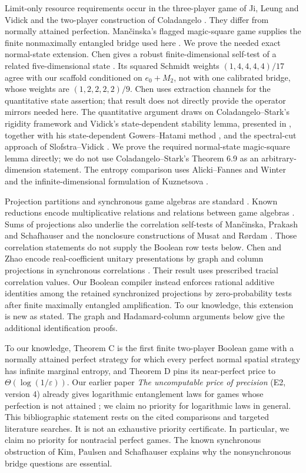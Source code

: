 Limit-only resource requirements occur in the three-player game of Ji, Leung and Vidick \cite{JLV} and the two-player construction of Coladangelo \cite{C19}. They differ from normally attained perfection. Man\v{c}inska's flagged magic-square game supplies the finite nonmaximally entangled bridge used here \cite{Mancinska}. We prove the needed exact normal-state extension. Chen gives a robust finite-dimensional self-test of a related five-dimensional state \cite{ChenRobust}. Its squared Schmidt weights $(1,4,4,4,4)/17$ agree with our scaffold conditioned on $e_0+M_2$, not with one calibrated bridge, whose weights are $(1,2,2,2,2)/9$. Chen uses extraction channels for the quantitative state assertion; that result does not directly provide the operator mirrors needed here. The quantitative argument draws on Coladangelo--Stark's rigidity framework and Vidick's state-dependent stability lemma, presented in \cite[Lemma 4.7]{CSRigidity}, together with his state-dependent Gowers--Hatami method \cite{VidickGH,GH}, and the spectral-cut approach of Slofstra--Vidick \cite{SV}. We prove the required normal-state magic-square lemma directly; we do not use Coladangelo--Stark's Theorem 6.9 as an arbitrary-dimension statement. The entropy comparison uses Alicki--Fannes and Winter and the infinite-dimensional formulation of Kuznetsova \cite{AF,Winter,Kuznetsova}.

Projection partitions and synchronous game algebras are standard \cite{Fritz,HMPS,BCS}. Known reductions encode multiplicative relations and relations between game algebras \cite{Slofstra,Fu,HarrisColor}. Sums of projections also underlie the correlation self-tests of Man\v{c}inska, Prakash and Schafhauser \cite{MPS} and the nonclosure constructions of Musat and R{\o}rdam \cite{MR}. Those correlation statements do not supply the Boolean row tests below. Chen and Zhao encode real-coefficient unitary presentations by graph and column projections in synchronous correlations \cite[Section 4]{CZ}. Their result uses prescribed tracial correlation values. Our Boolean compiler instead enforces rational additive identities among the retained synchronized projections by zero-probability tests after finite maximally entangled amplification. To our knowledge, this extension is new as stated. The graph and Hadamard-column arguments below give the additional identification proofs.

To our knowledge, Theorem C is the first finite two-player Boolean game with a normally attained perfect strategy for which every perfect normal spatial strategy has infinite marginal entropy, and Theorem D pins its near-perfect price to $\Theta(\log(1/\varepsilon))$. Our earlier paper \emph{The uncomputable price of precision} (E2, version 4) already gives logarithmic entanglement laws for games whose perfection is not attained \cite{E2}; we claim no priority for logarithmic laws in general. This bibliographic statement rests on the cited comparisons and targeted literature searches. It is not an exhaustive priority certificate. In particular, we claim no priority for nontracial perfect games. The known synchronous obstruction of Kim, Paulsen and Schafhauser \cite[Theorem 3.10 and Corollary 3.11]{KPS} explains why the nonsynchronous bridge questions are essential.

